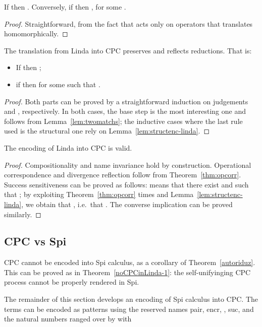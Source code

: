 \documentclass{LMCS}
\begin{document}
\begin{lem}
\label{lem:structenc-linda}
If  then .
Conversely, if  then , for some .
\end{lem}
\begin{proof}
Straightforward, from the fact that  acts only on operators that  translates homomorphically.
\end{proof}

\begin{thm}
\label{thm:opcorr}
The translation  from Linda into CPC preserves and reflects reductions.
That is:
\begin{itemize}
	\item If  then ;
	\item if  then  for some  such that .
\end{itemize}
\end{thm}
\begin{proof}
Both parts can be proved by a straightforward induction
on judgements  and , respectively.
In both cases, the base step is the most interesting one and
follows from Lemma~\ref{lem:twomatchs}; the inductive
cases where the last rule used is the structural one rely on
Lemma~\ref{lem:structenc-linda}.
\end{proof}

\begin{cor}
\label{cor:valid-linda}
The encoding of Linda into CPC is valid.
\end{cor}
\begin{proof}
Compositionality and name invariance hold by construction. 
Operational correspondence and divergence reflection
follow from Theorem~\ref{thm:opcorr}. Success sensitiveness
can be proved as follows:  means that there exist 
and  such that ; 
by exploiting Theorem~\ref{thm:opcorr}  times 
and Lemma~\ref{lem:structenc-linda}, we obtain that , i.e.\ that .
The converse implication can be proved similarly. 
\end{proof}



\subsection{CPC vs Spi}
\label{subsec:spi-new}
CPC cannot be encoded into Spi calculus, as a corollary of Theorem~\ref{autoriduz}.
This can be proved as in Theorem~\ref{noCPCinLinda-1}: the self-unifyinging CPC
process  cannot be properly rendered in Spi.

The remainder of this section develops an encoding of Spi calculus into CPC.
The terms can be encoded as patterns using the reserved
names {\sf pair}, {\sf encr}, , {\sf suc}, and the natural numbers  ranged over by  with
\end{document}
